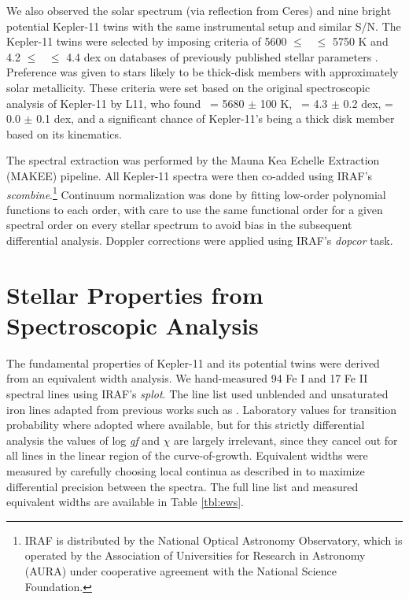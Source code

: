 \documentclass[oneside]{emulateapj}
\begin{document}
We also observed the solar spectrum (via reflection from Ceres) and nine bright potential Kepler-11 twins with the same instrumental setup and similar S/N. The Kepler-11 twins were selected by imposing criteria of 5600 $\leq$ \teff\ $\leq$ 5750 K and 4.2 $\leq$ \logg\ $\leq$ 4.4 dex on databases of previously published stellar parameters \citep{Adibekyan2012, Bensby2014}. Preference was given to stars likely to be thick-disk members with approximately solar metallicity. These criteria were set based on the original spectroscopic analysis of Kepler-11 by L11, who found \teff\ = 5680 $\pm$ 100 K, \logg\ = 4.3 $\pm$ 0.2 dex, \feh = 0.0 $\pm$ 0.1 dex, and a significant chance of Kepler-11's being a thick disk member based on its kinematics.

The spectral extraction was performed by the Mauna Kea Echelle Extraction (MAKEE) pipeline. All Kepler-11 spectra were then co-added using IRAF's \textit{scombine}.\footnote{IRAF is distributed by the National Optical Astronomy Observatory, which is operated by the Association of Universities for Research in Astronomy (AURA) under cooperative agreement with the National Science Foundation.} Continuum normalization was done by fitting low-order polynomial functions to each order, with care to use the same functional order for a given spectral order on every stellar spectrum to avoid bias in the subsequent differential analysis. Doppler corrections were applied using IRAF's \textit{dopcor} task.

\section{Stellar Properties from Spectroscopic Analysis}
\label{s:characterization}

The fundamental properties of Kepler-11 and its potential twins were derived from an equivalent width analysis. We hand-measured 94 Fe I and 17 Fe II spectral lines using IRAF's \textit{splot}. The line list used unblended and unsaturated iron lines adapted from previous works such as \citet{Ramirez2014}. Laboratory values for transition probability where adopted where available, but for this strictly differential analysis the values of log \textit{gf} and $\chi$ are largely irrelevant, since they cancel out for all lines in the linear region of the curve-of-growth. Equivalent widths were measured by carefully choosing local continua as described in \citet{Bedell2014} to maximize differential precision between the spectra. The full line list and measured equivalent widths are available in Table \ref{tbl:ews}.
\end{document}
